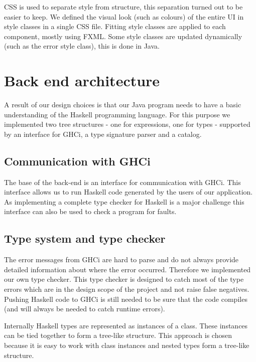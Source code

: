 CSS is used to separate style from structure, this separation turned out to be easier to keep. We defined the visual look (such as colours) of the entire UI in style classes in a single CSS file. Fitting style classes are applied to each component, mostly using FXML. Some style classes are updated dynamically (such as the error style class), this is done in Java.

\section{Back end architecture}

A result of our design choices is that our Java program needs to have a basic understanding of the Haskell programming
language. For this purpose we implemented two tree structures - one for expressions, one for types - supported by an
interface for GHCi, a type signature parser and a catalog.

\subsection{Communication with GHCi}
\label{GHCi}

The base of the back-end is an interface for communication with GHCi. This interface allows us to run Haskell code
generated by the users of our application. As implementing a complete type checker for Haskell is a major challenge this
interface can also be used to check a program for faults.

\subsection{Type system and type checker}

The error messages from GHCi are hard to parse and do not always provide detailed information about where the error
occurred. Therefore we implemented our own type checker. This type checker is designed to catch most of the type errors 
which are in the design scope of the project and not raise false negatives. Pushing Haskell code to GHCi is still needed
to be sure that the code compiles (and will always be needed to catch runtime errors).

Internally Haskell types are represented as instances of a class. These instances can be tied together to form a
tree-like structure. This approach is chosen because it is easy to work with class instances and nested types form
a tree-like structure. 

